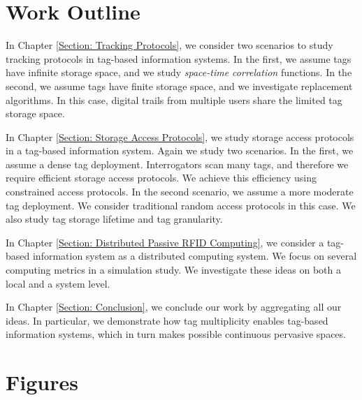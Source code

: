 \section{Work Outline}
In Chapter \ref{Section: Tracking Protocols}, we consider two scenarios to study tracking protocols in tag-based information systems. In the first, we assume tags have infinite storage space, and we study \emph{space-time correlation} functions. In the second, we assume tags have finite storage space, and we investigate replacement algorithms. In this case, digital trails from multiple users share the limited tag storage space. 

In Chapter \ref{Section: Storage Access Protocols}, we study storage access protocols in a tag-based information system. Again we study two scenarios. In the first, we assume a dense tag deployment. Interrogators scan many tags, and therefore we require efficient storage access protocols. We achieve this efficiency using constrained access protocols. In the second scenario, we assume a more moderate tag deployment. We consider traditional random access protocols in this case. We also study tag storage lifetime and tag granularity.

In Chapter \ref{Section: Distributed Passive RFID Computing}, we consider a tag-based information system as a distributed computing system. We focus on several computing metrics in a simulation study. We investigate these ideas on both a local and a system level.

In Chapter \ref{Section: Conclusion}, we conclude our work by aggregating all our ideas. In particular, we demonstrate how tag multiplicity enables tag-based information systems, which in turn makes possible continuous pervasive spaces.


\section{Figures}
\clearpage


